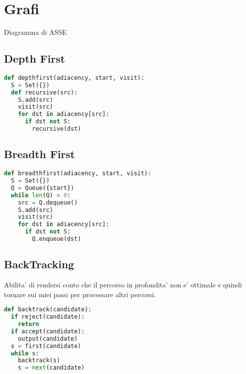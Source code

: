 \section{Grafi}

Diagramma di ASSE

\subsection{Depth First}

\begin{lstlisting}[language=Python]
def depthfirst(adiacency, start, visit):
  S = Set({})
  def recursive(src):
    S.add(src)
    visit(src)
    for dst in adiacency[src]:
      if dst not S:
        recursive(dst)
\end{lstlisting}

\subsection{Breadth First}

\begin{lstlisting}[language=Python]
def breadthfirst(adiacency, start, visit):
  S = Set({})
  Q = Queue({start})
  while len(Q) > 0:
    src = Q.dequeue()
    S.add(src)
    visit(src)
    for dst in adiacency[src]:
      if dst not S:
        Q.enqueue(dst)
\end{lstlisting}

\subsection{BackTracking}

Abilita' di rendersi conto che il percorso in profondita' non e' ottimale e quindi tornare sui miei passi per processare altri percorsi.

\begin{lstlisting}[language=Python]
def backtrack(candidate):
  if reject(candidate):
    return
  if accept(candidate):
    output(candidate)
  s = first(candidate)
  while s:
    backtrack(s)
    s = next(candidate)
\end{lstlisting}
